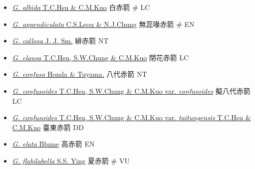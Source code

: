 \begin{itemize}
  \begin{itemize}
        \item[] \href{http://www.theplantlist.org/tpl1.1/search?q=Gastrodia+albida}{\textit{G. albida} T.C.Hsu \& C.M.Kuo}   白赤箭  \# LC
        \item[] \href{http://www.theplantlist.org/tpl1.1/search?q=Gastrodia+appendiculata}{\textit{G. appendiculata} C.S.Leou \& N.J.Chung}   無蕊喙赤箭  \# EN
        \item[] \href{http://www.theplantlist.org/tpl1.1/search?q=Gastrodia+callosa}{\textit{G. callosa} J. J. Sm.}   緋赤箭   NT
        \item[] \href{http://www.theplantlist.org/tpl1.1/search?q=Gastrodia+clausa}{\textit{G. clausa} T.C.Hsu, S.W.Chung \& C.M.Kuo}   閉花赤箭   LC
        \item[] \href{http://www.theplantlist.org/tpl1.1/search?q=Gastrodia+confusa}{\textit{G. confusa} Honda \& Tuyama.}   八代赤箭   NT
        \item[] \href{http://www.theplantlist.org/tpl1.1/search?q=Gastrodia+confusoides+var.+confusoides}{\textit{G. confusoides} T.C.Hsu, S.W.Chung \& C.M.Kuo var. \textit{confusoides}}   擬八代赤箭   LC
        \item[] \href{http://www.theplantlist.org/tpl1.1/search?q=Gastrodia+confusoides+var.+taitungensis}{\textit{G. confusoides} T.C.Hsu, S.W.Chung \& C.M.Kuo var. \textit{taitungensis} T.C.Hsu \& C.M.Kuo}   臺東赤箭   DD
        \item[] \href{http://www.theplantlist.org/tpl1.1/search?q=Gastrodia+elata}{\textit{G. elata} Blume}   高赤箭   EN
        \item[] \href{http://www.theplantlist.org/tpl1.1/search?q=Gastrodia+flabilabella}{\textit{G. flabilabella} S.S. Ying}   夏赤箭  \# VU

\end{itemize}
\end{itemize}
